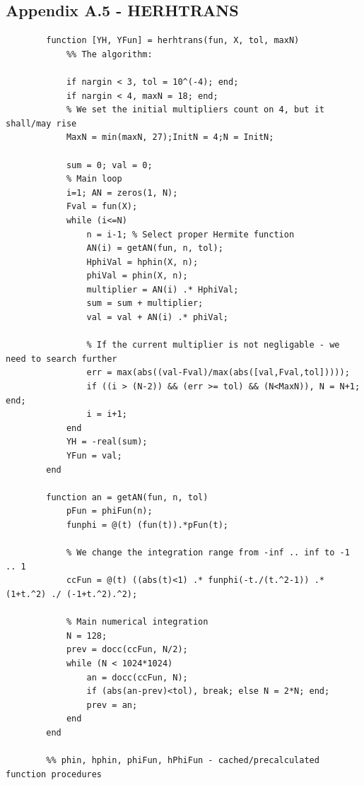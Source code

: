 \documentclass[12pt,twoside,a4paper]{article}
\numberwithin{equation}{subsection}
\numberwithin{figure}{subsection}
\begin{document}
\subsection*{Appendix A.5 - HERHTRANS}
\begin{lstlisting}
		function [YH, YFun] = herhtrans(fun, X, tol, maxN)    
		    %% The algorithm:
		    
		    if nargin < 3, tol = 10^(-4); end;
		    if nargin < 4, maxN = 18; end;
		    % We set the initial multipliers count on 4, but it shall/may rise  
		    MaxN = min(maxN, 27);InitN = 4;N = InitN;
		    
		    sum = 0; val = 0;
		    % Main loop
		    i=1; AN = zeros(1, N);
		    Fval = fun(X);
		    while (i<=N)
		        n = i-1; % Select proper Hermite function
		        AN(i) = getAN(fun, n, tol);
		        HphiVal = hphin(X, n); 
		        phiVal = phin(X, n); 
		        multiplier = AN(i) .* HphiVal;
		        sum = sum + multiplier;
		        val = val + AN(i) .* phiVal;
		        
		        % If the current multiplier is not negligable - we need to search further
		        err = max(abs((val-Fval)/max(abs([val,Fval,tol]))));
		        if ((i > (N-2)) && (err >= tol) && (N<MaxN)), N = N+1; end; 
		        i = i+1;
		    end
		    YH = -real(sum);
		    YFun = val;
		end
		
		function an = getAN(fun, n, tol)
		    pFun = phiFun(n);
		    funphi = @(t) (fun(t)).*pFun(t);
		    
		    % We change the integration range from -inf .. inf to -1 .. 1
		    ccFun = @(t) ((abs(t)<1) .* funphi(-t./(t.^2-1)) .* (1+t.^2) ./ (-1+t.^2).^2);
		    
		    % Main numerical integration
		    N = 128; 
		    prev = docc(ccFun, N/2);
		    while (N < 1024*1024)
		        an = docc(ccFun, N);
		        if (abs(an-prev)<tol), break; else N = 2*N; end;
		        prev = an;
		    end
		end
		
		%% phin, hphin, phiFun, hPhiFun - cached/precalculated function procedures
\end{lstlisting}
\end{document}
